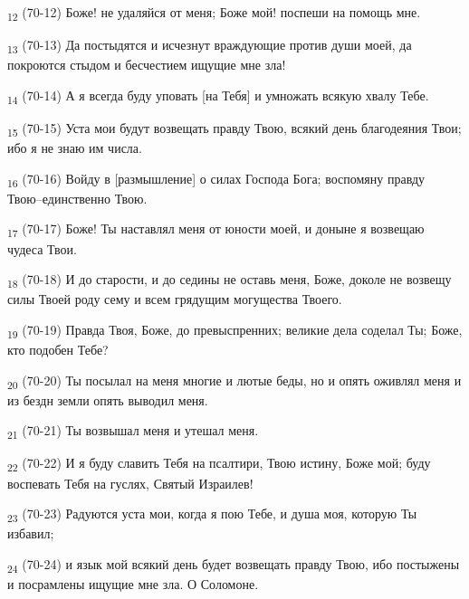 \begin{tcolorbox}
\textsubscript{12} (70-12) Боже! не удаляйся от меня; Боже мой! поспеши на помощь мне.
\end{tcolorbox}
\begin{tcolorbox}
\textsubscript{13} (70-13) Да постыдятся и исчезнут враждующие против души моей, да покроются стыдом и бесчестием ищущие мне зла!
\end{tcolorbox}
\begin{tcolorbox}
\textsubscript{14} (70-14) А я всегда буду уповать [на Тебя] и умножать всякую хвалу Тебе.
\end{tcolorbox}
\begin{tcolorbox}
\textsubscript{15} (70-15) Уста мои будут возвещать правду Твою, всякий день благодеяния Твои; ибо я не знаю им числа.
\end{tcolorbox}
\begin{tcolorbox}
\textsubscript{16} (70-16) Войду в [размышление] о силах Господа Бога; воспомяну правду Твою--единственно Твою.
\end{tcolorbox}
\begin{tcolorbox}
\textsubscript{17} (70-17) Боже! Ты наставлял меня от юности моей, и доныне я возвещаю чудеса Твои.
\end{tcolorbox}
\begin{tcolorbox}
\textsubscript{18} (70-18) И до старости, и до седины не оставь меня, Боже, доколе не возвещу силы Твоей роду сему и всем грядущим могущества Твоего.
\end{tcolorbox}
\begin{tcolorbox}
\textsubscript{19} (70-19) Правда Твоя, Боже, до превыспренних; великие дела соделал Ты; Боже, кто подобен Тебе?
\end{tcolorbox}
\begin{tcolorbox}
\textsubscript{20} (70-20) Ты посылал на меня многие и лютые беды, но и опять оживлял меня и из бездн земли опять выводил меня.
\end{tcolorbox}
\begin{tcolorbox}
\textsubscript{21} (70-21) Ты возвышал меня и утешал меня.
\end{tcolorbox}
\begin{tcolorbox}
\textsubscript{22} (70-22) И я буду славить Тебя на псалтири, Твою истину, Боже мой; буду воспевать Тебя на гуслях, Святый Израилев!
\end{tcolorbox}
\begin{tcolorbox}
\textsubscript{23} (70-23) Радуются уста мои, когда я пою Тебе, и душа моя, которую Ты избавил;
\end{tcolorbox}
\begin{tcolorbox}
\textsubscript{24} (70-24) и язык мой всякий день будет возвещать правду Твою, ибо постыжены и посрамлены ищущие мне зла. О Соломоне.
\end{tcolorbox}
